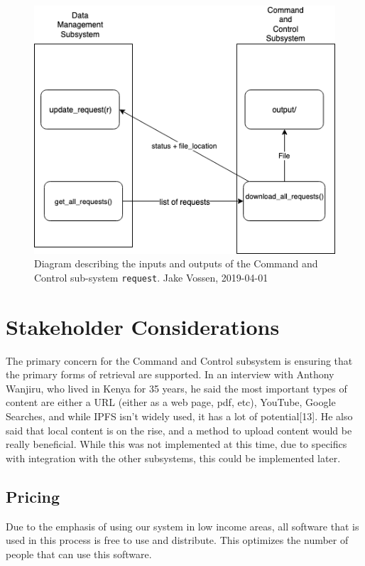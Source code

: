\documentclass{article}
\begin{document}
\begin{figure}[H]
  \centering
  \includegraphics[scale=.5]{input-output.png}
  \caption{\begingroup \fontsize{10pt}{10pt}\selectfont Diagram
    describing the inputs and outputs of the Command and Control sub-system
    \texttt{request}. Jake Vossen, 2019-04-01 \endgroup}
\end{figure}

\section{Stakeholder Considerations}

The primary concern for the Command and Control subsystem is ensuring
that the primary forms of retrieval are supported. In an interview with
Anthony Wanjiru, who lived in Kenya for 35 years, he said the most
important types of content are either a URL (either as a web page,
pdf, etc), YouTube, Google Searches, and while IPFS isn't widely used,
it has a lot of potential[13]. He also said that local content is on
the rise, and a method to upload content would be really
beneficial. While this was not implemented at this time, due to
specifics with integration with the other subsystems, this could be
implemented later. 

\subsection{Pricing}

Due to the emphasis of using our system in low income areas, all
software that is used in this process is free to use and
distribute. This optimizes the number of people that can use this
software. 
\end{document}
